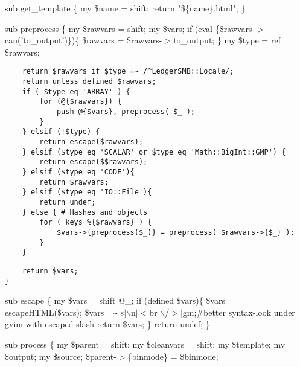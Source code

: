\begin{description}
\begin{description}
\begin{description}
\begin{description}
\begin{description}
\begin{description}
\begin{description}
\begin{description}
\begin{description}
\begin{description}
sub get\_template \{
    my \$name = shift;
    return "\$\{name\}.html";
\}



sub preprocess \{
    my \$rawvars = shift;
    my \$vars;
    if (eval \{\$rawvars-$>$can('to\_output')\})\{
        \$rawvars = \$rawvars-$>$to\_output;
    \}
    my \$type = ref \$rawvars;

\begin{verbatim}
    return $rawvars if $type =~ /^LedgerSMB::Locale/;
    return unless defined $rawvars;
    if ( $type eq 'ARRAY' ) {
        for (@{$rawvars}) {
            push @{$vars}, preprocess( $_ );
        }
    } elsif (!$type) {
        return escape($rawvars);
    } elsif ($type eq 'SCALAR' or $type eq 'Math::BigInt::GMP') {
        return escape($$rawvars);
    } elsif ($type eq 'CODE'){
        return $rawvars;
    } elsif ($type eq 'IO::File'){
        return undef;
    } else { # Hashes and objects
        for ( keys %{$rawvars} ) {
            $vars->{preprocess($_)} = preprocess( $rawvars->{$_} );
        }
    }
\end{verbatim}
\begin{verbatim}
    return $vars;
}
\end{verbatim}


sub escape \{
    my \$vars = shift @\_;
    if (defined \$vars)\{
        \$vars = escapeHTML(\$vars);
        \$vars =\texttt{\~{}} s$|$$\backslash$n$|$$<$br $\backslash$/$>$$|$gm;\#better syntax-look under gvim with escaped slash
        return \$vars;
    \}
    return undef;
\}



sub process \{
	my \$parent = shift;
	my \$cleanvars = shift;
	my \$template;
	my \$output;
	my \$source;
        \$parent-$>$\{binmode\} = \$binmode;


\end{description}
\end{description}
\end{description}
\end{description}
\end{description}
\end{description}
\end{description}
\end{description}
\end{description}
\end{description}
